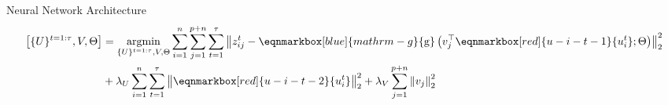 \documentclass{beamer}
\begin{document}
\begin{frame}[allowframebreaks]{Neural Network Architecture}
	\begin{align*}
		\begin{aligned}
			{\left[\{U\}^{t=1: \tau}, V, \Theta\right] } & =\underset{\{U\}^{t=1: \tau}, V, \Theta}{\operatorname{argmin}} \sum_{i=1}^n \sum_{j=1}^{p+n} \sum_{t=1}^\tau\left\|z_{i j}^t-\eqnmarkbox[blue]{mathrm-g}{\mathrm{g}}\left(v_j^{\top} \eqnmarkbox[red]{u-i-t-1}{u_i^t} ; \Theta\right)\right\|_2^2 \\
			& +\lambda_U \sum_{i=1}^n \sum_{t=1}^\tau\left\|\eqnmarkbox[red]{u-i-t-2}{u_i^t}\right\|_2^2+\lambda_V \sum_{j=1}^{p+n}\left\|v_j\right\|_2^2
		\end{aligned}
	\end{align*}


\end{frame}
\end{document}
